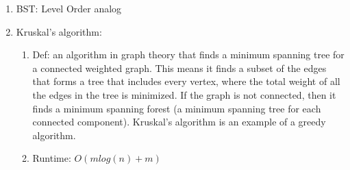 \documentclass[12pt]{article}
\renewcommand{\=}[1]{\stackrel{#1}{=}} %
\theoremstyle{definition}
\theoremstyle{remark}
\begin{document}
\begin{enumerate}
\begin{enumerate}
\begin{enumerate}
      \item BST: Level Order analog

      \item Kruskal's algorithm:
        \begin{enumerate}
        \item Def: an algorithm in graph theory that finds a minimum spanning tree for a connected weighted graph. This means it finds a subset of the edges that forms a tree that includes every vertex, where the total weight of all the edges in the tree is minimized. If the graph is not connected, then it finds a minimum spanning forest (a minimum spanning tree for each connected component). Kruskal's algorithm is an example of a greedy algorithm.
        \item Runtime: $O(mlog(n)+m)$
        \end{enumerate}


\end{enumerate}
\end{enumerate}
\end{enumerate}
\end{document}
